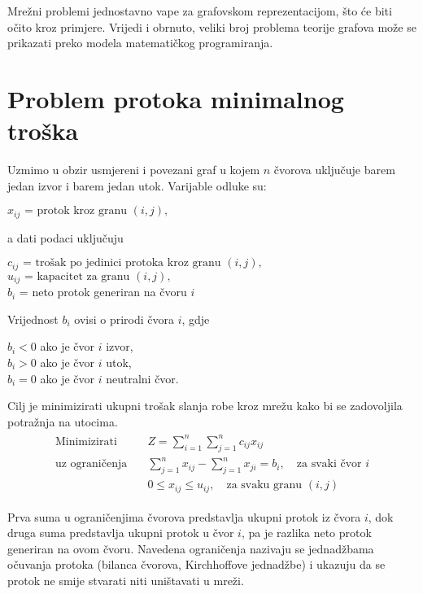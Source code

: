 \documentclass[11pt, a4paper]{article}
\begin{document}
	Mrežni problemi jednostavno vape za grafovskom reprezentacijom, što će biti očito kroz primjere. Vrijedi i obrnuto, veliki broj problema teorije grafova može se prikazati preko modela matematičkog programiranja.
	
	\newpage
	\section{Problem protoka minimalnog troška}
	

	Uzmimo u obzir usmjereni i povezani graf u kojem \( n \) čvorova uključuje barem jedan izvor i barem jedan utok. Varijable odluke su:
	
	\( x_{ij} \text{ = protok kroz granu } (i,j),\)
	
	a dati podaci uključuju
	
	\( c_{ij} \text{ = trošak po jedinici protoka kroz granu } (i,j), \)\\
	\( u_{ij} \text{ = kapacitet za granu } (i,j), \)\\
	\(b_i \) = neto protok generiran na čvoru \( i \)
	
	Vrijednost \( b_i \) ovisi o prirodi čvora \( i \), gdje

	\( b_i<0 \) ako je čvor \( i \) izvor,\\
	\( b_i>0 \) ako je čvor \( i \) utok,\\
	\( b_i = 0 \) ako je čvor \( i \) neutralni čvor.
	
	Cilj je minimizirati ukupni trošak slanja robe kroz mrežu kako bi se zadovoljila potražnja na utocima.
	\begin{align*}
		\begin{split}
			\text{Minimizirati} \quad & Z = \sum_{i=1}^{n}\sum_{j=1}^{n} c_{ij}x_{ij} \\
			\text{uz ograničenja} \quad & \sum_{j=1}^{n} x_{ij} - \sum_{j=1}^{n} x_{ji} = b_i, \quad\text{za svaki čvor } i \\
			& 0 \leq x_{ij} \leq u_{ij}, \quad\text{za svaku granu } (i,j)
		\end{split}
	\end{align*}
	
	Prva suma u ograničenjima čvorova predstavlja ukupni protok iz čvora \( i \), dok druga suma predstavlja ukupni protok u čvor \( i \), pa je razlika neto
	protok generiran na ovom čvoru. Navedena ograničenja nazivaju se jednadžbama očuvanja protoka (bilanca čvorova, Kirchhoffove jednadžbe) i ukazuju da se protok ne smije stvarati niti uništavati u mreži. 
\end{document}
